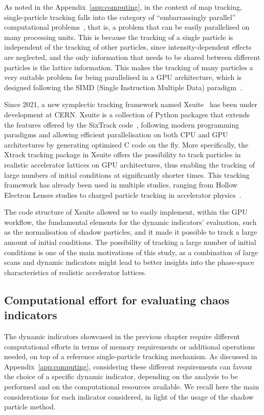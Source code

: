 As noted in the Appendix~\ref{app:computing}, in the context of map tracking, single-particle tracking falls into the category of ``embarrassingly parallel'' computational problems~\cite{Giovannozzi:317866}, that is, a problem that can be easily parallelised on many processing units. This is because the tracking of a single particle is independent of the tracking of other particles, since intensity-dependent effects are neglected, and the only information that needs to be shared between different particles is the lattice information. This makes the tracking of many particles a very suitable problem for being parallelised in a GPU architecture, which is designed following the SIMD (Single Instruction Multiple Data) paradigm~\cite{DBLP:journals/corr/abs-1202-4347}.

Since 2021, a new symplectic tracking framework named Xsuite~\cite{xsuite} has been under development at CERN. Xsuite is a collection of Python packages that extends the features offered by the SixTrack code~\cite{De_Maria_2019}, following modern programming paradigms and allowing efficient parallelisation on both CPU and GPU architectures by generating optimised C code on the fly. More specifically, the Xtrack tracking package in Xsuite offers the possibility to track particles in realistic accelerator lattices on GPU architectures, thus enabling the tracking of large numbers of initial conditions at significantly shorter times. This tracking framework has already been used in multiple studies, ranging from Hollow Electron Lenses studies to charged particle tracking in accelerator physics~\cite{pang2014gpu,oeftiger:hb16-mopr025,adelmann2019opal,schwinzerl:ipac21-thpab190,hermes:ipac2022-mopost045,iliakis2022enabling}.

The code structure of Xsuite allowed us to easily implement, within the GPU workflow, the fundamental elements for the dynamic indicators' evaluation, such as the normalisation of shadow particles, and it made it possible to track a large amount of initial conditions. The possibility of tracking a large number of initial conditions is one of the main motivations of this study, as a combination of large scans and dynamic indicators might lead to better insights into the phase-space characteristics of realistic accelerator lattices.
%
\subsection{Computational effort for evaluating chaos indicators}

The dynamic indicators showcased in the previous chapter require different computational efforts in terms of memory requirements or additional operations needed, on top of a reference single-particle tracking mechanism. As discussed in Appendix~\ref{app:computing}, considering these different requirements can favour the choice of a specific dynamic indicator, depending on the analysis to be performed and on the computational resources available. We recall here the main considerations for each indicator considered, in light of the usage of the shadow particle method.


